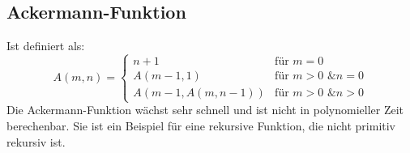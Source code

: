 \documentclass{article}
\begin{document}
\begin{minipage}[t]{0.45\textwidth}
\begin{center}
    \end{center}

    \subsection*{Ackermann-Funktion}
    Ist definiert als:
    \[
    A(m, n) =
    \begin{cases}
        n + 1 & \text{für } m = 0 \\
        A(m - 1, 1) & \text{für } m > 0 \text{ \& } n = 0 \\
        A(m - 1, A(m, n - 1)) & \text{für } m > 0 \text{ \& } n > 0
    \end{cases}
    \]
    Die Ackermann-Funktion wächst sehr schnell und ist nicht in polynomieller Zeit berechenbar. Sie ist ein Beispiel für eine rekursive Funktion, die nicht primitiv rekursiv ist.
\end{minipage}
\end{document}
